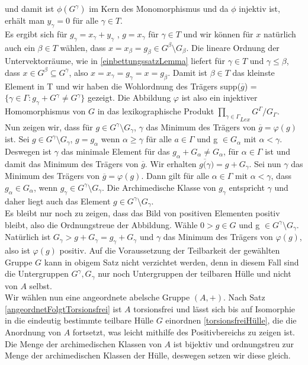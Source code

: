 {und damit ist $\phi(G^\gamma)$ im Kern des Monomorphismus und da $\phi$ injektiv ist, erhält man $y_\gamma = 0$ für alle $ \gamma \in T$.\\
Es ergibt sich für $g_\gamma = x_\gamma + y_\gamma$ , $g = x_\gamma$ für $\gamma \in T$ und wir können für $x$ natürlich auch ein $\beta \in T$ wählen, dass $x = x_\beta = g_\beta \in G^\beta \setminus G_\beta$. Die lineare Ordnung der Untervektorräume, wie in \ref{einbettungssatzLemma} liefert für $\gamma \in T$ und $\gamma \le \beta$, dass $x \in G^\beta \subseteq G^\gamma$, also $x = x_\gamma = g_\gamma = x = g_\beta$. Damit ist $\beta \in T $ das kleinste Element in T und wir haben die Wohlordnung des Trägers supp($\overline{g}$) = $\lbrace \gamma \in \Gamma: g_\gamma + G^\gamma \neq G^\gamma \rbrace$ gezeigt. Die Abbildung $\varphi$ ist also ein injektiver Homomorphismus von $G$ in das lexikographische Produkt ${\prod_{\gamma \in \Gamma}}_{Lex} G^\Gamma/ G_\Gamma$.\\
Nun zeigen wir, dass für  $g \in G^\gamma \setminus G_\gamma$, $\gamma$ das Minimum des Trägers von $\overline{g} = \varphi(g)$ ist. Sei $g \in G^\gamma \setminus G_\gamma$, $g = g_\alpha$ wenn $\alpha \ge \gamma$ für alle $a \in \Gamma$ und g $\in G_\alpha$ mit $\alpha < \gamma$. Deswegen ist $\gamma$ das minimale Element für das $g_\alpha + G_\alpha \neq G_\alpha$, für $\alpha \in \Gamma$ ist und damit das Minimum des Trägers von $\overline{g}$. Wir erhalten $\overline{g(\gamma}) = g + G_\gamma$. Sei nun $\gamma$ das Minimum des Trägers von $\overline{g} = \varphi(g)$. Dann gilt für alle $\alpha \in \Gamma$ mit $\alpha < \gamma$, dass $g_\alpha \in G_\alpha$, wenn $g_\gamma \in G^\gamma \setminus G_\gamma$. Die Archimedische Klasse von $g_\gamma$ entspricht $\gamma$ und daher liegt auch das Element $g \in G^\gamma \setminus G_\gamma$.\\
Es bleibt nur noch zu zeigen, dass das Bild von positiven Elementen positiv bleibt, also die Ordnungstreue der Abbildung. Wähle $0 > g \in G$ und g $\in G^\gamma \setminus G_\gamma$. Natürlich ist $G_\gamma > g + G_\gamma = g_\gamma + G_\gamma$ und $\gamma$ das Minimum des Trägers von $\varphi(g)$, also ist $\varphi(g)$ positiv. 
}
Auf die Voraussetzung der Teilbarkeit der gewählten Gruppe $G$ kann in obigem Satz nicht verzichtet werden, denn in diesem Fall sind die Untergruppen $G^\gamma, G_\gamma$ nur noch Untergruppen der teilbaren Hülle und nicht von $A$ selbst.\\ 
Wir wählen nun eine angeordnete abelsche Gruppe $\left(A, +\right)$. Nach Satz \ref{angeordnetFolgtTorsionsfrei} ist $A$ torsionsfrei und lässt sich bis auf Isomorphie in die eindeutig bestimmte teilbare Hülle $G$ einordnen \ref{torsionsfreiHülle}, die die Anordnung von $A$ fortsetzt, was leicht mithilfe des Positivbereichs zu zeigen ist. Die Menge der archimedischen Klassen von $A$ ist bijektiv und ordnungstreu zur Menge der archimedischen Klassen der Hülle, deswegen setzen wir diese gleich.  \\
